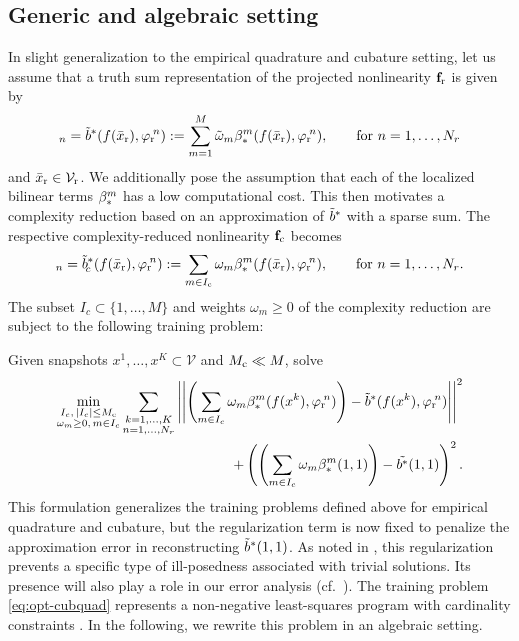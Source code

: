 \documentclass[onefignum,onetabnum]{siamart251104}
\newcommand{\bv}[1]{{\mathbf #1}}
\newcommand{\funSpace}[1]{\mathcal{#1}}
\newcommand{\com}[1]{{{#1}_{\rm{c}}}} %
\newcommand{\rom}[1]{{{#1}_{\rm{r}}}}
\newcommand{\Nr}{{N_r}}
\newcommand{\ffun}{{\bv{f}}}
\newcommand{\bform}{{b}}
\newcommand{\tL}{{\fs{\varphi}}}
\newcommand{\fs}[1]{{{#1}}} %
\newcommand{\wei}{{\omega}} %
\newcommand{\xrf}{{\rom{\bar{x}}}}
\begin{document}
\subsection{Generic and algebraic setting} \label{sec:genericSetting}
In slight generalization to the empirical quadrature and cubature setting, let us assume that a truth sum representation of the projected nonlinearity $\rom{\ffun}$ is given by
\begin{align*}
[\rom{\ffun}(\xrf)]_n= \tilde{\bform}\!^{\,\rm{*}}(f(\xrf),\rom{\tL}\!^n) := \sum_{m=1}^{M_{}} \tilde{\wei}_m  \beta_{\rm{*}}^m(f(\xrf),\rom{\tL}\!^n), \hspace{0.7cm} \text{for } n = 1,\ldots, \Nr
\end{align*}
and $\xrf \in \rom{\funSpace{V}}$. We additionally pose the assumption that each of the localized bilinear terms $\beta_{\rm{*}}^m$ has a low computational cost. This then motivates a complexity reduction based on an approximation of $\tilde{\bform}\!^{\,\rm{*}}$ with a sparse sum. The respective complexity-reduced nonlinearity $\com{\ffun}$ becomes
\begin{align*}
[\com{\ffun}(\xrf)]_n ={\tilde{\bform}}\!^{\,\rm{*}}_c(f(\xrf),\rom{\tL}\!^n) 
:= \sum_{m\in \com{I}} {\wei}_m  \beta_{\rm{*}}^m(f(\xrf),\rom{\tL}\!^n), \hspace{0.7cm} \text{for } n = 1,\ldots, \Nr.
\end{align*}
The subset $I_c \subset \{1,\ldots , M  \}$ and weights $\wei_m \geq 0$ of the complexity reduction are subject to the following training problem:


Given snapshots $\fs{x}^1, \ldots, \fs{x}^K \subset \funSpace{V}$ and $\com{M}\ll M_{}$, solve
{\small
\begin{align} 
\begin{split}\label{eq:opt-cubquad}
	\min_{\substack{I_c, \,|I_c| \leq \com{M}\\
			            \wei_m \geq 0, \,m \in I_c } }
\sum_{\substack{k = 1,\ldots,K\\ n= 1,\ldots,\Nr}}			            
			             \left|\left| \left(\sum_{m \in I_c} {\wei}_m \beta_{\rm{*}}^m({f}({\fs{x}}^k),\rom{\tL}\!^n) \right)
			             - \tilde{\bform}\!^{\,\rm{*}}({f}({\fs{x}}^k), \rom{\tL}\!^n)\right|\right|^2 \\
			             + \left( \left(\sum_{m \in I_c} {\wei}_m \beta_{\rm{*}}^m(1,1) \right) - \tilde{\bform\!^{\,\rm{*}}}(1,1) \right)^2 .
\end{split}
\end{align}
}%
This formulation generalizes the training problems defined above for empirical quadrature and cubature, but the regularization term is now fixed to penalize the approximation error in reconstructing $\tilde{\bform}^{\rm *}(1,1)$. As noted in \cite{art:hyperreduction-fem-cubature}, this regularization prevents a specific type of ill-posedness associated with trivial solutions. Its presence will also play a role in our error analysis (cf.~). The training problem \eqref{eq:opt-cubquad} represents a non-negative least-squares program with cardinality constraints \cite{art:nguyen2019non,proc:blumensath2008gradient}. In the following, we rewrite this problem in an algebraic setting. 
\end{document}
